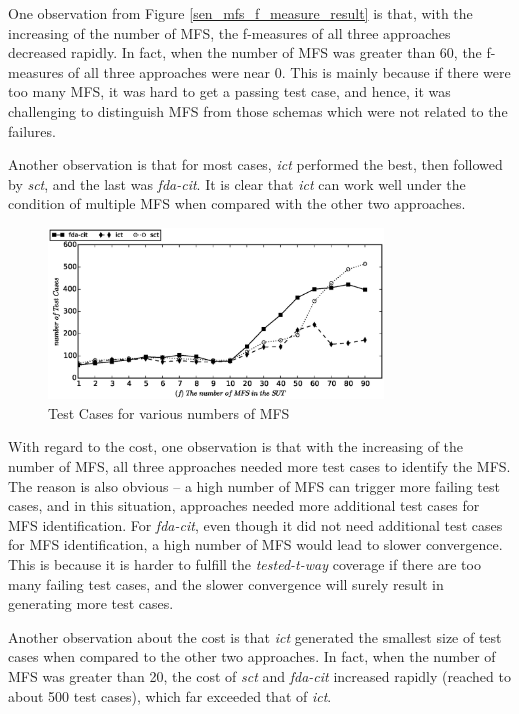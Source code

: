 \documentclass[journal,12pt,onecolumn,draftclsnofoot,]{IEEEtran}
\begin{document}
One observation from Figure \ref{sen_mfs_f_measure_result} is that, with the increasing of the number of MFS, the f-measures of all three approaches decreased rapidly. In fact, when the number of MFS was greater than 60, the f-measures of all three approaches were near 0. This is mainly because if there were too many MFS, it was hard to get a passing test case, and hence, it was challenging to distinguish MFS from those schemas which were not related to the failures.

Another observation is that for most cases, \emph{ict} performed the best, then followed by \emph{sct}, and the last was \emph{fda-cit}. It is clear that \emph{ict} can work well under the condition of multiple MFS when compared with the other two approaches.



\begin{figure}[htbp]
 \includegraphics[width=3.5in]{sens_mfs_tests.eps}
\caption{Test Cases for various numbers of MFS}
\label{sen_mfs_tests_result}
\end{figure}


With regard to the cost, one observation is that with the increasing of the number of MFS, all three approaches needed more test cases to identify the MFS. The reason is also obvious -- a high number of MFS can trigger more failing test cases, and in this situation, approaches needed more additional test cases for MFS identification. For \emph{fda-cit}, even though it did not need additional test cases for MFS identification, a high number of MFS would lead to slower convergence. This is because it is harder to fulfill the \emph{tested-t-way} coverage if there are too many failing test cases, and the slower convergence will surely result in generating more test cases.


Another observation about the cost is that \emph{ict} generated the smallest size of test cases when compared to the other two approaches. In fact, when the number of MFS was greater than 20, the cost of \emph{sct} and \emph{fda-cit} increased rapidly (reached to about 500 test cases), which far exceeded that of \emph{ict}.
\end{document}
